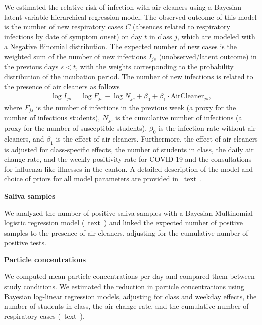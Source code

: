 \documentclass[fleqn,11pt]{wlscirep}
\begin{document}
\noindent We estimated the relative risk of infection with air cleaners using a Bayesian latent variable hierarchical regression model. The observed outcome of this model is the number of new respiratory cases $C$ (absences related to respiratory infections by date of symptom onset) on day $t$ in class $j$, which are modeled with a Negative Binomial distribution. The expected number of new cases is the weighted sum of the number of new infections $I_{js}$ (unobserved/latent outcome) in the previous days $s<t$, with the weights corresponding to the probability distribution of the incubation period. The number of new infections is related to the presence of air cleaners as follows
\begin{align}
    \log I_{js} = \log F_{js} - \log N_{js} + \beta_0 + \beta_1 \cdot \text{AirCleaner}_{js},
\end{align}
where $F_{js}$ is the number of infections in the previous week (a proxy for the number of infectious students), $N_{js}$ is the cumulative number of infections (a proxy for the number of susceptible students), $\beta_0$ is the infection rate without air cleaners, and $\beta_1$ is the effect of air cleaners. Furthermore, the effect of air cleaners is adjusted for class-specific effects, the number of students in class, the daily air change rate, and the weekly positivity rate for COVID-19 and the consultations for influenza-like illnesses in the canton. A detailed description of the model and choice of priors for all model parameters are provided in \supp~text~. \medskip

\noindent\textbf{Saliva samples} \smallskip

\noindent We analyzed the number of positive saliva samples with a Bayesian Multinomial logistic regression model (\supp~text~) and linked the expected number of positive samples to the presence of air cleaners, adjusting for the cumulative number of positive tests. \medskip

\noindent\textbf{Particle concentrations} \smallskip

\noindent We computed mean particle concentrations per day and compared them between study conditions. We estimated the reduction in particle concentrations using Bayesian log-linear regression models, adjusting for class and weekday effects, the number of students in class, the air change rate, and the cumulative number of respiratory cases (\supp~text~). \medskip
\end{document}
